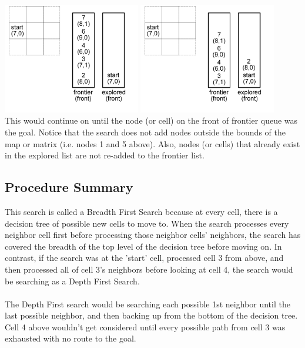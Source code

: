 \documentclass[12pt]{article}
\begin{document}
\includegraphics[width=60mm]{images/breadth/pos04.png}
\includegraphics[width=60mm]{images/breadth/pos05.png}
\\
This would continue on until the node (or cell) on the front of frontier queue was the goal. Notice that the search does not add nodes outside the bounds of the map or matrix (i.e. nodes 1 and 5 above). Also, nodes (or cells) that already exist in the explored list are not re-added to the frontier list.
\subsection{Procedure Summary}
This search is called a Breadth First Search because at every cell, there is a decision tree of possible new cells to move to. When the search processes every neighbor cell first before processing those neighbor cells' neighbors, the search has covered the breadth of the top level of the decision tree before moving on. In contrast, if the search was at the 'start' cell, processed cell 3 from above, and then processed all of cell 3's neighbors before looking at cell 4, the search would be searching as a Depth First Search.
\\ \\
The Depth First search would be searching each possible 1st neighbor until the last possible neighbor, and then backing up from the bottom of the decision tree. Cell 4 above wouldn't get considered until every possible path from cell 3 was exhausted with no route to the goal.
\end{document}
